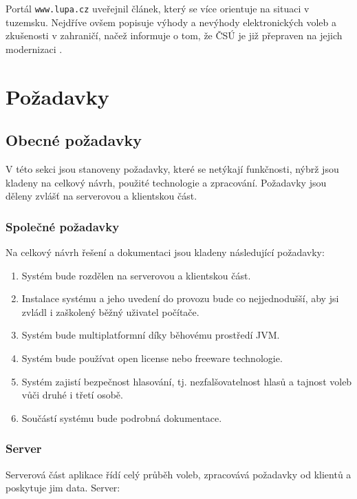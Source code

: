\documentclass[11pt,twoside,a4paper]{book}
\begin{document}
Portál \texttt{www.lupa.cz} \cite{www:lupa} uveřejnil článek, který se více orientuje na situaci v tuzemsku. Nejdříve ovšem popisuje výhody a nevýhody elektronických voleb a zkušenosti v zahraničí, načež informuje o tom, že ČSÚ je již přepraven na jejich modernizaci \cite{www:csu}. 

\section{Požadavky}

\subsection{Obecné požadavky}

V této sekci jsou stanoveny požadavky, které se netýkají funkčnosti, nýbrž jsou kladeny na celkový návrh, použité technologie a zpracování. Požadavky jsou děleny zvlášť na serverovou a klientskou část.

\subsubsection{Společné požadavky} \label{sec:obecne_pozadavky}

Na celkový návrh řešení a dokumentaci jsou kladeny následující požadavky:

\begin{enumerate}
	\item Systém bude rozdělen na serverovou a klientskou část.
	\item Instalace systému a jeho uvedení do provozu bude co nejjednodušší, aby jsi zvládl i zaškolený běžný uživatel počítače.
	\item Systém bude multiplatformní díky běhovému prostředí JVM.
	\item Systém bude používat open license nebo freeware technologie.
	\item Systém zajistí bezpečnost hlasování, tj. nezfalšovatelnost hlasů a tajnost voleb vůči druhé i třetí osobě.
	\item Součástí systému bude podrobná dokumentace.
\end{enumerate}

\subsubsection{Server}

Serverová část aplikace řídí celý průběh voleb, zpracovává požadavky od klientů a poskytuje jim data. Server:
\end{document}
